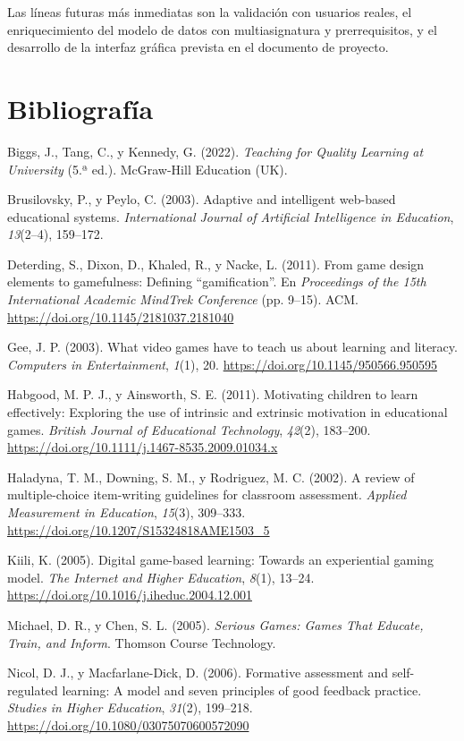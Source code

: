 \documentclass[11pt,a4paper]{article}
\begin{document}
Las líneas futuras más inmediatas son la validación con usuarios reales, el enriquecimiento del modelo de datos con multiasignatura y prerrequisitos, y el desarrollo de la interfaz gráfica prevista en el documento de proyecto.

\section{Bibliografía}

Biggs, J., Tang, C., y Kennedy, G. (2022). \textit{Teaching for Quality Learning at University} (5.ª ed.). McGraw-Hill Education (UK).

Brusilovsky, P., y Peylo, C. (2003). Adaptive and intelligent web-based educational systems. \textit{International Journal of Artificial Intelligence in Education}, \textit{13}(2--4), 159--172.

Deterding, S., Dixon, D., Khaled, R., y Nacke, L. (2011). From game design elements to gamefulness: Defining ``gamification''. En \textit{Proceedings of the 15th International Academic MindTrek Conference} (pp. 9--15). ACM. \url{https://doi.org/10.1145/2181037.2181040}

Gee, J. P. (2003). What video games have to teach us about learning and literacy. \textit{Computers in Entertainment}, \textit{1}(1), 20. \url{https://doi.org/10.1145/950566.950595}

Habgood, M. P. J., y Ainsworth, S. E. (2011). Motivating children to learn effectively: Exploring the use of intrinsic and extrinsic motivation in educational games. \textit{British Journal of Educational Technology}, \textit{42}(2), 183--200. \url{https://doi.org/10.1111/j.1467-8535.2009.01034.x}

Haladyna, T. M., Downing, S. M., y Rodriguez, M. C. (2002). A review of multiple-choice item-writing guidelines for classroom assessment. \textit{Applied Measurement in Education}, \textit{15}(3), 309--333. \url{https://doi.org/10.1207/S15324818AME1503_5}

Kiili, K. (2005). Digital game-based learning: Towards an experiential gaming model. \textit{The Internet and Higher Education}, \textit{8}(1), 13--24. \url{https://doi.org/10.1016/j.iheduc.2004.12.001}

Michael, D. R., y Chen, S. L. (2005). \textit{Serious Games: Games That Educate, Train, and Inform}. Thomson Course Technology.

Nicol, D. J., y Macfarlane-Dick, D. (2006). Formative assessment and self-regulated learning: A model and seven principles of good feedback practice. \textit{Studies in Higher Education}, \textit{31}(2), 199--218. \url{https://doi.org/10.1080/03075070600572090}
\end{document}
